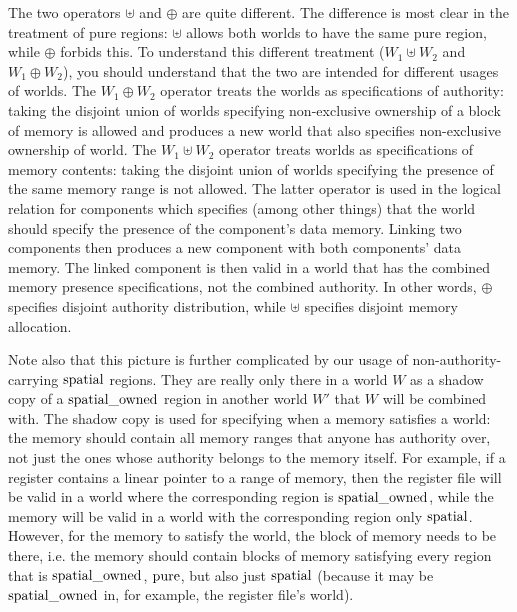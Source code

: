 \begin{jversion}
The two operators $\uplus$ and $\oplus$ are quite different.
The difference is most clear in the treatment of pure regions: $\uplus$ allows both worlds to have the same pure region, while $\oplus$ forbids this.
To understand this different treatment ($W_1 \uplus W_2$ and $W_1 \oplus W_2$), you should understand that the two are intended for different usages of worlds.
The $W_1 \oplus W_2$ operator treats the worlds as specifications of authority: taking the disjoint union of worlds specifying non-exclusive ownership of a block of memory is allowed and produces a new world that also specifies non-exclusive ownership of world. 
The $W_1 \uplus W_2$  operator treats worlds as specifications of memory contents: taking the disjoint union of worlds specifying the presence of the same memory range is not allowed.
The latter operator is used in the logical relation for components which specifies (among other things) that the world should specify the presence of the component's data memory.
Linking two components then produces a new component with both components' data memory.
The linked component is then valid in a world that has the combined memory presence specifications, not the combined authority.
In other words, $\oplus$ specifies disjoint authority distribution, while $\uplus$ specifies disjoint memory allocation.

Note also that this picture is further complicated by our usage of non-authority-carrying $\mathrm{spatial}$ regions.
They are really only there in a world $W$ as a shadow copy of a $\mathrm{spatial\_owned}$ region in another world $W'$ that $W$ will be combined with.
The shadow copy is used for specifying when a memory satisfies a world: the memory should contain all memory ranges that anyone has authority over, not just the ones whose authority belongs to the memory itself.
For example, if a register contains a linear pointer to a range of memory, then the register file will be valid in a world where the corresponding region is $\mathrm{spatial\_owned}$, while the memory will be valid in a world with the corresponding region only $\mathrm{spatial}$.
However, for the memory to satisfy the world, the block of memory needs to be there, i.e. the memory should contain blocks of memory satisfying every region that is $\mathrm{spatial\_owned}$, $\mathrm{pure}$, but also just $\mathrm{spatial}$ (because it may be $\mathrm{spatial\_owned}$ in, for example, the register file's world).



\end{jversion}
